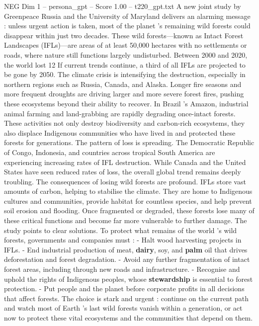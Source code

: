 \begin{textsample}{NEG Dim 1 – persona\_gpt – Score 1.00 – t220\_gpt.txt}  \label{ex:f1_neg_036}
A new joint study by Greenpeace Russia and the University of Maryland delivers an alarming message : unless urgent action is taken, most of the planet ’s remaining wild forests could disappear within just two decades.
These wild forests—known as Intact Forest Landscapes (IFLs)—are areas of at least 50,000 hectares with no settlements or roads, where nature still functions largely undisturbed.
Between 2000 and 2020, the world lost 12 %
If current trends continue, a third of all IFLs are projected to be gone by 2050.
The climate crisis is intensifying the destruction, especially in northern regions such as Russia, Canada, and Alaska.
Longer fire seasons and more frequent droughts are driving larger and more severe forest fires, pushing these ecosystems beyond their ability to recover.
In Brazil ’s Amazon, industrial animal farming and land-grabbing are rapidly degrading once-intact forests.
These activities not only destroy biodiversity and carbon-rich ecosystems, they also displace Indigenous communities who have lived in and protected these forests for generations.
The pattern of loss is spreading.
The Democratic Republic of Congo, Indonesia, and countries across tropical South America are experiencing increasing rates of IFL destruction.
While Canada and the United States have seen reduced rates of loss, the overall global trend remains deeply troubling.
The consequences of losing wild forests are profound.
IFLs store vast amounts of carbon, helping to stabilise the climate.
They are home to Indigenous cultures and communities, provide habitat for countless species, and help prevent soil erosion and flooding.
Once fragmented or degraded, these forests lose many of these critical functions and become far more vulnerable to further damage.
The study points to clear solutions.
To protect what remains of the world ’s wild forests, governments and companies must : - Halt wood harvesting projects in IFLs. - End industrial production of meat, \textbf{dairy}, soy, and \textbf{palm} oil that drives deforestation and forest degradation. - Avoid any further fragmentation of intact forest areas, including through new roads and infrastructure. - Recognise and uphold the rights of Indigenous peoples, whose \textbf{stewardship} is essential to forest protection. - Put people and the planet before corporate profits in all decisions that affect forests.
The choice is stark and urgent : continue on the current path and watch most of Earth ’s last wild forests vanish within a generation, or act now to protect these vital ecosystems and the communities that depend on them.

\end{textsample}
